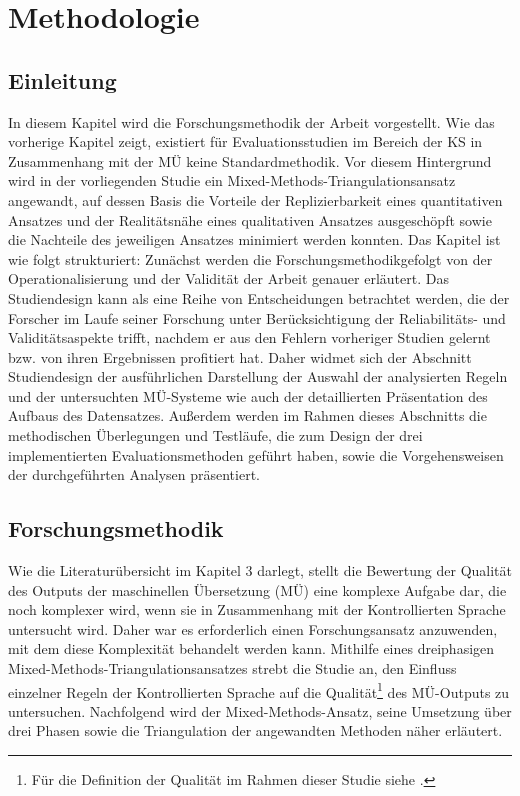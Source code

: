 \chapter{\label{ch:4}Methodologie}


\section{\label{sec:4.0}{Einleitung}}

In diesem Kapitel wird die Forschungsmethodik der Arbeit vorgestellt. Wie das vorherige Kapitel zeigt, existiert für Evaluationsstudien im Bereich der KS in Zusammenhang mit der MÜ keine Standardmethodik. Vor diesem Hintergrund wird in der vorliegenden Studie ein Mixed-Methods-Triangulationsansatz angewandt, auf dessen Basis die Vorteile der Replizierbarkeit eines quantitativen Ansatzes und der Realitätsnähe eines qualitativen Ansatzes ausgeschöpft sowie die Nachteile des jeweiligen Ansatzes minimiert werden konnten. Das Kapitel ist wie folgt strukturiert: Zunächst werden die Forschungsmethodikgefolgt von der Operationalisierung und der Validität der Arbeit genauer erläutert. Das Studiendesign kann als eine Reihe von Entscheidungen betrachtet werden, die der Forscher im Laufe seiner Forschung unter Berücksichtigung der Reliabilitäts- und Validitätsaspekte trifft, nachdem er aus den Fehlern vorheriger Studien gelernt bzw. von ihren Ergebnissen profitiert hat. Daher widmet sich der Abschnitt Studiendesign der ausführlichen Darstellung der Auswahl der analysierten Regeln und der untersuchten MÜ-Systeme wie auch der detaillierten Präsentation des Aufbaus des Datensatzes. Außerdem werden im Rahmen dieses Abschnitts die methodischen Überlegungen und Testläufe, die zum Design der drei implementierten Evaluationsmethoden geführt haben, sowie die Vorgehensweisen der durchgeführten Analysen präsentiert.

\section{\label{sec:4.1}Forschungsmethodik}

Wie die Literaturübersicht im Kapitel 3 darlegt, stellt die Bewertung der Qualität des Outputs der maschinellen Übersetzung (MÜ) eine komplexe Aufgabe dar, die noch komplexer wird, wenn sie in Zusammenhang mit der Kontrollierten Sprache untersucht wird. Daher war es erforderlich einen Forschungsansatz anzuwenden, mit dem diese Komplexität behandelt werden kann. Mithilfe eines dreiphasigen Mixed-Methods-Triangulationsansatzes strebt die Studie an, den Einfluss einzelner Regeln der Kontrollierten Sprache auf die Qualität\footnote{{{{F}}}\textrm{ür die Definition der Qualität im Rahmen dieser Studie siehe .}} des MÜ-Outputs zu untersuchen. Nachfolgend wird der Mixed-Methods-Ansatz, seine Umsetzung über drei Phasen sowie die Triangulation der angewandten Methoden näher erläutert.

